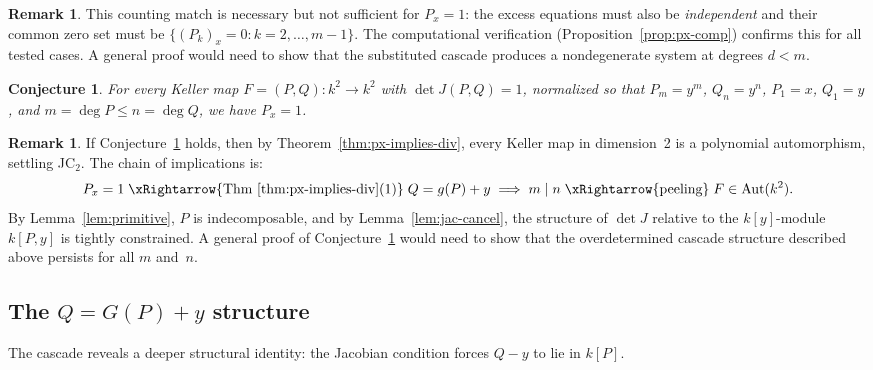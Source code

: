 \documentclass[12pt,a4paper]{article}
\newtheorem{conjecture}[theorem]{Conjecture}
\theoremstyle{definition}
\newtheorem{remark}[theorem]{Remark}
\newcommand{\kk}{k}
\newcommand{\Aut}{\operatorname{Aut}}
\begin{document}
\begin{remark}
This counting match is necessary but not sufficient for $P_x = 1$: the
excess equations must also be \emph{independent} and their common zero set
must be $\{(P_k)_x = 0 : k = 2, \ldots, m-1\}$. The computational
verification (Proposition~\ref{prop:px-comp}) confirms this for all tested
cases. A general proof would need to show that the substituted cascade
produces a nondegenerate system at degrees $d < m$.
\end{remark}

\begin{conjecture}\label{conj:px}
For every Keller map $F = (P,Q) \colon \kk^2 \to \kk^2$ with $\det J(P,Q) = 1$,
normalized so that $P_m = y^m$, $Q_n = y^n$, $P_1 = x$, $Q_1 = y$, and
$m = \deg P \leq n = \deg Q$, we have $P_x = 1$.
\end{conjecture}

\begin{remark}
If Conjecture~\ref{conj:px} holds, then by Theorem~\ref{thm:px-implies-div},
every Keller map in dimension~2 is a polynomial automorphism, settling JC$_2$.
The chain of implications is:
\[
  P_x = 1 \;\xRightarrow{\text{Thm~\ref{thm:px-implies-div}(1)}}\;
  Q = g(P) + y \;\Longrightarrow\;
  m \mid n \;\xRightarrow{\text{peeling}}\;
  F \in \Aut(\kk^2).
\]
By Lemma~\ref{lem:primitive}, $P$ is indecomposable, and by
Lemma~\ref{lem:jac-cancel}, the structure of $\det J$ relative to the
$\kk[y]$-module $\kk[P, y]$ is tightly constrained. A general proof of
Conjecture~\ref{conj:px} would need to show that the overdetermined cascade
structure described above persists for all $m$ and~$n$.
\end{remark}

\subsection{The \texorpdfstring{$Q = G(P) + y$}{Q = G(P) + y} structure}\label{sec:gpy}

The cascade reveals a deeper structural identity: the Jacobian condition
forces $Q - y$ to lie in $\kk[P]$.
\end{document}
